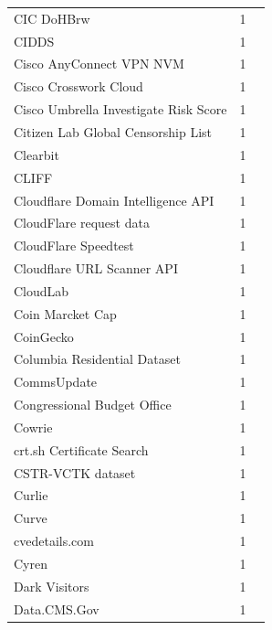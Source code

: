 \documentclass[11pt,a4paper]{article}
\begin{document}
\begin{longtable}{@{}p{} p{}p{}@{}}
CIC DoHBrw & 1 & \cite{10.1145/3777912.3839833} \\
CIDDS & 1 & \cite{10.1145/3646547.3689011} \\
Cisco AnyConnect VPN NVM & 1 & \cite{10.1007/978-3-030-72582-2_31} \\
Cisco Crosswork Cloud & 1 & \cite{10.1007/978-3-031-85960-1_14} \\
Cisco Umbrella Investigate Risk Score & 1 & \cite{10.1007/978-3-030-72582-2_31} \\
Citizen Lab Global Censorship List & 1 & \cite{10.1007/978-3-031-56249-5_5} \\
Clearbit & 1 & \cite{10.1145/3487552.3487853} \\
CLIFF & 1 & \cite{10.1145/3618257.3624816} \\
Cloudflare Domain Intelligence API & 1 & \cite{10.1145/3517745.3561418} \\
CloudFlare request data & 1 & \cite{10.1145/3517745.3561444} \\
CloudFlare Speedtest & 1 & \cite{10.1007/978-3-030-98785-5_4} \\
Cloudflare URL Scanner API & 1 & \cite{10.1145/3777912.3839788} \\
CloudLab & 1 & \cite{10.1007/978-3-031-85960-1_15} \\
Coin Marcket Cap & 1 & \cite{10.1145/3777912.3809150} \\
CoinGecko & 1 & \cite{10.1145/3777912.3809150} \\
Columbia Residential Dataset & 1 & \cite{10.1145/3777912.3839790} \\
CommsUpdate & 1 & \cite{10.1145/3487552.3487822} \\
Congressional Budget Office & 1 & \cite{10.1007/978-3-032-18268-5_4} \\
Cowrie & 1 & \cite{10.1145/3618257.3624826} \\
crt.sh Certificate Search & 1 & \cite{10.1145/3517745.3561425} \\
CSTR-VCTK dataset & 1 & \cite{10.1145/3730567.3764444} \\
Curlie & 1 & \cite{10.1145/3618257.3624842} \\
Curve & 1 & \cite{10.1145/3777912.3809150} \\
cvedetails.com & 1 & \cite{10.1145/3618257.3624804} \\
Cyren & 1 & \cite{10.1145/3777912.3839787} \\
Dark Visitors & 1 & \cite{10.1145/3730567.3732913} \\
Data.CMS.Gov & 1 & \cite{10.1145/3777912.3809147} \\

\end{longtable}
\end{document}
